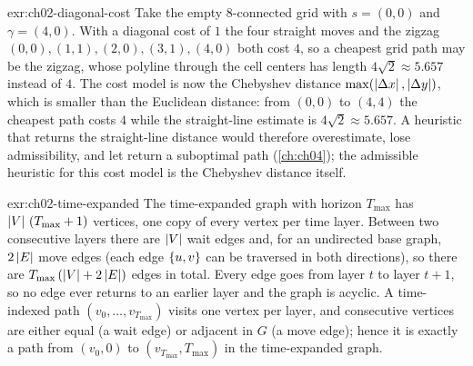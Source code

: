 
\begin{solution}{exr:ch02-diagonal-cost}
Take the empty 8-connected grid with $s=(0,0)$ and $\gamma=(4,0)$. With a diagonal cost of $1$ the four straight moves and the zigzag $(0,0),(1,1),(2,0),(3,1),(4,0)$ both cost $4$, so a cheapest grid path may be the zigzag, whose polyline through the cell centers has length $4\sqrt2\approx5.657$ instead of $4$. The cost model is now the Chebyshev distance $\max(\left\lvert \Delta x \right\rvert,\left\lvert \Delta y \right\rvert)$, which is smaller than the Euclidean distance: from $(0,0)$ to $(4,4)$ the cheapest path costs $4$ while the straight-line estimate is $4\sqrt2\approx5.657$. A heuristic that returns the straight-line distance would therefore overestimate, lose admissibility, and let \astar return a suboptimal path (\cref{ch:ch04}); the admissible heuristic for this cost model is the Chebyshev distance itself.
\end{solution}

\begin{solution}{exr:ch02-time-expanded}
The time-expanded graph with horizon $T_{\max}$ has $\left\lvert V \right\rvert\,(T_{\max}+1)$ vertices, one copy of every vertex per time layer. Between two consecutive layers there are $\left\lvert V \right\rvert$ wait edges and, for an undirected base graph, $2\left\lvert E \right\rvert$ move edges (each edge $\left\{ u,v \right\}$ can be traversed in both directions), so there are $T_{\max}\,(\left\lvert V \right\rvert+2\left\lvert E \right\rvert)$ edges in total. Every edge goes from layer $t$ to layer $t+1$, so no edge ever returns to an earlier layer and the graph is acyclic. A time-indexed path $(v_0,\dots,v_{T_{\max}})$ visits one vertex per layer, and consecutive vertices are either equal (a wait edge) or adjacent in $G$ (a move edge); hence it is exactly a path from $(v_0,0)$ to $(v_{T_{\max}},T_{\max})$ in the time-expanded graph.
\end{solution}

